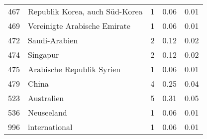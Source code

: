 \begin{longtable}{lXrrr}
        467 & \multicolumn{1}{X}{Republik Korea, auch Süd-Korea} & %
          \num{1} &
          \num[round-mode=places,round-precision=2]{0,06} &
          \num[round-mode=places,round-precision=2]{0,01} \\

        469 & \multicolumn{1}{X}{Vereinigte Arabische Emirate} & %
          \num{1} &
          \num[round-mode=places,round-precision=2]{0,06} &
          \num[round-mode=places,round-precision=2]{0,01} \\

        472 & \multicolumn{1}{X}{Saudi-Arabien} & %
          \num{2} &
          \num[round-mode=places,round-precision=2]{0,12} &
          \num[round-mode=places,round-precision=2]{0,02} \\

        474 & \multicolumn{1}{X}{Singapur} & %
          \num{2} &
          \num[round-mode=places,round-precision=2]{0,12} &
          \num[round-mode=places,round-precision=2]{0,02} \\

        475 & \multicolumn{1}{X}{Arabische Republik Syrien} & %
          \num{1} &
          \num[round-mode=places,round-precision=2]{0,06} &
          \num[round-mode=places,round-precision=2]{0,01} \\

        479 & \multicolumn{1}{X}{China} & %
          \num{4} &
          \num[round-mode=places,round-precision=2]{0,25} &
          \num[round-mode=places,round-precision=2]{0,04} \\

        523 & \multicolumn{1}{X}{Australien} & %
          \num{5} &
          \num[round-mode=places,round-precision=2]{0,31} &
          \num[round-mode=places,round-precision=2]{0,05} \\

        536 & \multicolumn{1}{X}{Neuseeland} & %
          \num{1} &
          \num[round-mode=places,round-precision=2]{0,06} &
          \num[round-mode=places,round-precision=2]{0,01} \\

        996 & \multicolumn{1}{X}{international} & %
          \num{1} &
          \num[round-mode=places,round-precision=2]{0,06} &
          \num[round-mode=places,round-precision=2]{0,01} \\


\end{longtable}
